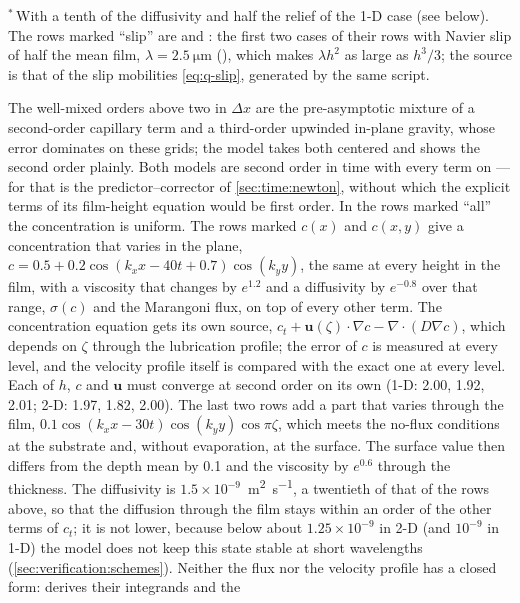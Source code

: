 \noindent$^{*}$\,With a tenth of the diffusivity and half the relief of the 1-D case (see below).
The rows marked ``slip'' are  and : the
first two cases of their rows with Navier slip of half the mean film,
$\lambda = \SI{2.5}{\micro\metre}$ (), which makes $\lambda h^2$
as large as $h^3/3$; the source is that of the slip mobilities
\cref{eq:q-slip}, generated by the same script.

The well-mixed orders above two in $\Delta x$ are the pre-asymptotic mixture
of a second-order capillary term and a third-order upwinded in-plane gravity,
whose error dominates on these grids; the  model takes both centered
and shows the second order plainly. Both models are second order in time with
every term on --- for  that is the predictor--corrector of
\cref{sec:time:newton}, without which the explicit terms of its film-height
equation would be first order. In the  rows marked ``all'' the
concentration is uniform. The rows marked $c(x)$ and $c(x,y)$ give  a
concentration that varies in the plane, $c = 0.5 + 0.2\cos(k_x x - 40t + 0.7)\cos(k_y y)$,
the same at every height in the film, with a viscosity that changes by
$e^{1.2}$ and a diffusivity by $e^{-0.8}$ over that range, $\sigma(c)$ and the
Marangoni flux, on top of every other  term. The concentration
equation gets its own source, $c_t + \mathbf{u}(\zeta)\cdot\nabla c -
\nabla\cdot(D\nabla c)$, which depends on $\zeta$ through the lubrication
profile; the error of $c$ is measured at every level, and the velocity
profile itself is compared with the exact one at every level. Each of $h$,
$c$ and $\mathbf{u}$ must converge at second order on its own (1-D: 2.00,
1.92, 2.01; 2-D: 1.97, 1.82, 2.00). The last two rows add a part that varies through the film,
$0.1\cos(k_x x-30t)\cos(k_y y)\cos\pi\zeta$, which meets the no-flux
conditions at the substrate and, without evaporation, at the surface. The
surface value then differs from the depth mean by 0.1 and the viscosity by
$e^{0.6}$ through the thickness. The diffusivity is
$1.5\times10^{-9}$~\si{\metre\squared\per\second}, a twentieth of that of
the rows above, so that the diffusion through the film stays within an order
of the other terms of $c_t$; it is not lower, because below about
$1.25\times10^{-9}$ in 2-D (and $10^{-9}$ in 1-D) the model does not keep
this state stable at short wavelengths (\cref{sec:verification:schemes}). Neither the flux nor the velocity profile
has a closed form:  derives their integrands and the
